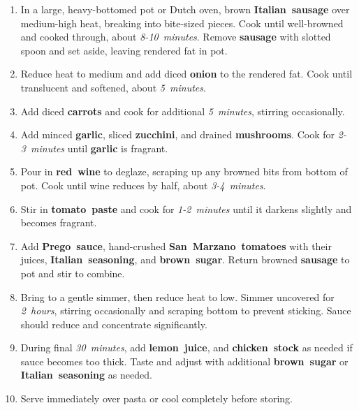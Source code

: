 \documentclass[11pt,letterpaper]{article}
\begin{document}
\begin{enumerate}
    \item In a large, heavy-bottomed pot or Dutch oven, brown \textbf{Italian~sausage} over medium-high heat, breaking into bite-sized pieces. Cook until well-browned and cooked through, about \textit{8-10~minutes}. Remove \textbf{sausage} with slotted spoon and set aside, leaving rendered fat in pot.
    
    \item Reduce heat to medium and add diced \textbf{onion} to the rendered fat. Cook until translucent and softened, about \textit{5~minutes}.
    
    \item Add diced \textbf{carrots} and cook for additional \textit{5~minutes}, stirring occasionally.
    
    \item Add minced \textbf{garlic}, sliced \textbf{zucchini}, and drained \textbf{mushrooms}. Cook for \textit{2-3~minutes} until \textbf{garlic} is fragrant.
    
    \item Pour in \textbf{red~wine} to deglaze, scraping up any browned bits from bottom of pot. Cook until wine reduces by half, about \textit{3-4~minutes}.
    
    \item Stir in \textbf{tomato~paste} and cook for \textit{1-2~minutes} until it darkens slightly and becomes fragrant.
    
    \item Add \textbf{Prego~sauce}, hand-crushed \textbf{San~Marzano~tomatoes} with their juices, \textbf{Italian~seasoning}, and \textbf{brown~sugar}. Return browned \textbf{sausage} to pot and stir to combine.
    
    \item Bring to a gentle simmer, then reduce heat to low. Simmer uncovered for \textit{2~hours}, stirring occasionally and scraping bottom to prevent sticking. Sauce should reduce and concentrate significantly.
    
    \item During final \textit{30~minutes}, add \textbf{lemon~juice}, and \textbf{chicken~stock} as needed if sauce becomes too thick. Taste and adjust with additional \textbf{brown~sugar} or \textbf{Italian~seasoning} as needed. 
    
    
    \item Serve immediately over pasta or cool completely before storing.
\end{enumerate}
\end{document}
